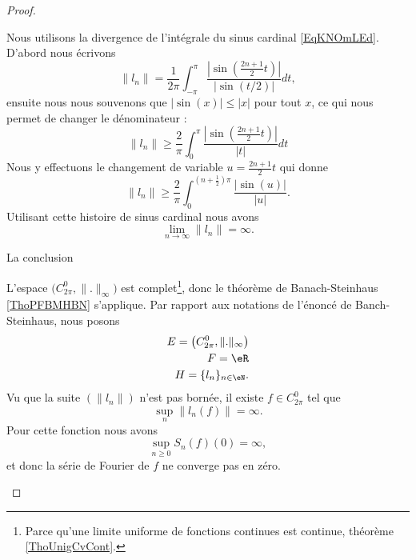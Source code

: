 \begin{proof}
\begin{subproof}
            Nous utilisons la divergence de l'intégrale du sinus cardinal \eqref{EqKNOmLEd}. D'abord nous écrivons
            \begin{equation}
                \| l_n \|=\frac{1}{ 2\pi }\int_{-\pi}^{\pi}\frac{ \left| \sin\left( \frac{ 2n+1 }{2}t \right) \right|  }{ \big| \sin(t/2) \big| }dt,
            \end{equation}
            ensuite nous nous souvenons que \( | \sin(x) |\leq | x |\) pour tout \( x\), ce qui nous permet de changer le dénominateur :
            \begin{equation}
                \| l_n \|\geq \frac{ 2 }{ \pi }\int_0^{\pi}\frac{ \left| \sin\left( \frac{ 2n+1 }{2}t \right) \right|  }{ | t | }dt
            \end{equation}
            Nous y effectuons le changement de variable \( u=\frac{ 2n+1 }{2}t\) qui donne
            \begin{equation}
                \| l_n \|\geq \frac{ 2 }{ \pi }\int_{0}^{(n+\frac{ 1 }{2})\pi}\frac{ \big| \sin(u) \big| }{ | u | }.
            \end{equation}
            Utilisant cette histoire de sinus cardinal nous avons
            \begin{equation}
                \lim_{n\to \infty} \| l_n \|=\infty.
            \end{equation}
            

        \item[La conclusion]

            L'espace \( \big( C^0_{2\pi},\| . \|_{\infty} \big)\) est complet\footnote{Parce qu'une limite uniforme de fonctions continues est continue, théorème \ref{ThoUnigCvCont}.}, donc le théorème de Banach-Steinhaus \ref{ThoPFBMHBN} s'applique. Par rapport aux notations de l'énoncé de Banch-Steinhaus, nous posons
            \begin{subequations}
                \begin{align}
                    E=\big( C^0_{2\pi},\| . \|_{\infty} \big)\\
                    F=\eR\\
                    H=\{ l_n \}_{n\in \eN}.
                \end{align}
            \end{subequations}
            Vu que la suite \( (\| l_n \|)\) n'est pas bornée, il existe \( f\in C^0_{2\pi}\) tel que
            \begin{equation}
                \sup_n\| l_n(f) \|=\infty.
            \end{equation}
            Pour cette fonction nous avons
            \begin{equation}
                \sup_{n\geq 0}S_n(f)(0)=\infty,
            \end{equation}
            et donc la série de Fourier de \( f\) ne converge pas en zéro.

        \end{subproof}
\end{proof}

